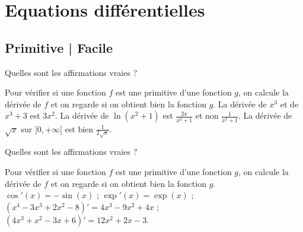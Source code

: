 



\section{Equations différentielles}


\subsection{Primitive | Facile}


\begin{question}
Quelles sont les affirmations vraies ?
\begin{answers} 
  \good{$\sqrt x$ est une primitive de $\frac 1{2\sqrt x}$ (sur $]0,+\infty[$).}
\end{answers}
\begin{explanations} 
Pour vérifier si une fonction \(f\) est une primitive d'une fonction \(g\), on calcule la dérivée de  \(f\) et on regarde si on obtient bien la fonction \(g\). La dérivée de $x^3$ et de $x^3+3$ est $3x^2$. La dérivée de $\ln(x^2+1)$ est $\frac {2x}{x^2+1}$ et non $\frac 1{x^2+1}$. La dérivée de $\sqrt x$ sur $]0,+\infty[$ est bien $\frac 1{2\sqrt x}$.
\end{explanations}
\end{question}


\begin{question}
Quelles sont les affirmations vraies ?
\begin{answers}  
\end{answers}
\begin{explanations}
Pour vérifier si une fonction \(f\) est une primitive d'une fonction \(g\), on calcule la dérivée de  \(f\) et on regarde si on obtient bien la fonction \(g\).
$\cos'(x)=-\sin(x)$ ; $\exp'(x)=\exp(x)$ ; $(x^4-3x^3+2x^2-8)'=4x^3-9x^2+4x$ ; $(4x^3+x^2-3x+6)'=12x^2+2x-3$.
\end{explanations}
\end{question}


